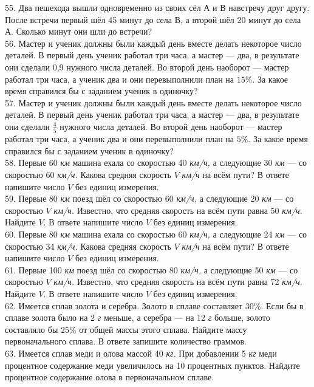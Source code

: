 55. Два пешехода вышли одновременно из своих сёл А и В навстречу друг другу. После встречи первый шёл 45 минут до села В, а второй шёл 20 минут до села А. Сколько минут они шли до встречи?\\
56. Мастер и ученик должны были каждый день вместе делать некоторое число деталей. В первый день ученик работал три часа, а мастер --- два, в результате они сделали 0,9 нужного числа деталей. Во второй день наоборот --- мастер работал три часа, а ученик два и они перевыполнили план на $15\%.$ За какое время справился бы с заданием ученик в одиночку?\\
57. Мастер и ученик должны были каждый день вместе делать некоторое число деталей. В первый день ученик работал три часа, а мастер --- два, в результате они сделали $\frac{4}{5}$ нужного числа деталей. Во второй день наоборот --- мастер работал три часа, а ученик два и они перевыполнили план на $5\%.$ За какое время справился бы с заданием ученик в одиночку?\\
58. Первые 60 {\it км} машина ехала со скоростью 40 {\it км/ч,} а следующие 30 {\it км} --- со скоростью 60 {\it км/ч.} Какова средняя скорость $V$ {\it км/ч} на всём пути? В ответе напишите число $V$ без единиц измерения.\\
59. Первые 80 {\it км} поезд шёл со скоростью 60 {\it км/ч,} а следующие 20 {\it км} --- со скоростью $V$ {\it км/ч.} Известно, что средняя скорость на всём пути равна 50 {\it км/ч.} Найдите $V.$ В ответе напишите число $V$ без единиц измерения.\\
60. Первые 80 {\it км} машина ехала со скоростью 60 {\it км/ч,} а следующие 24 {\it км} --- со скоростью 34 {\it км/ч.} Какова средняя скорость $V$ {\it км/ч} на всём пути? В ответе напишите число $V$ без единиц измерения.\\
61. Первые 100 {\it км} поезд шёл со скоростью 80 {\it км/ч,} а следующие 50 {\it км} --- со скоростью $V$ {\it км/ч.} Известно, что средняя скорость на всём пути равна 72 {\it км/ч.} Найдите $V.$ В ответе напишите число $V$ без единиц измерения.\\
62. Имеется сплав золота и серебра. Золото в сплаве составляет $30\%.$ Если бы в сплаве золота было на 2 {\it г} меньше, а серебра --- на 12 {\it г} больше, золото составляло бы $25\%$ от общей массы этого сплава. Найдите массу первоначального сплава. В ответе запишите количество граммов.\\
63. Имеется сплав меди и олова массой 40 {\it кг.} При добавлении 5 {\it кг} меди процентное содержание меди увеличилось на 10 процентных пунктов. Найдите процентное содержание олова в первоначальном сплаве.\\
